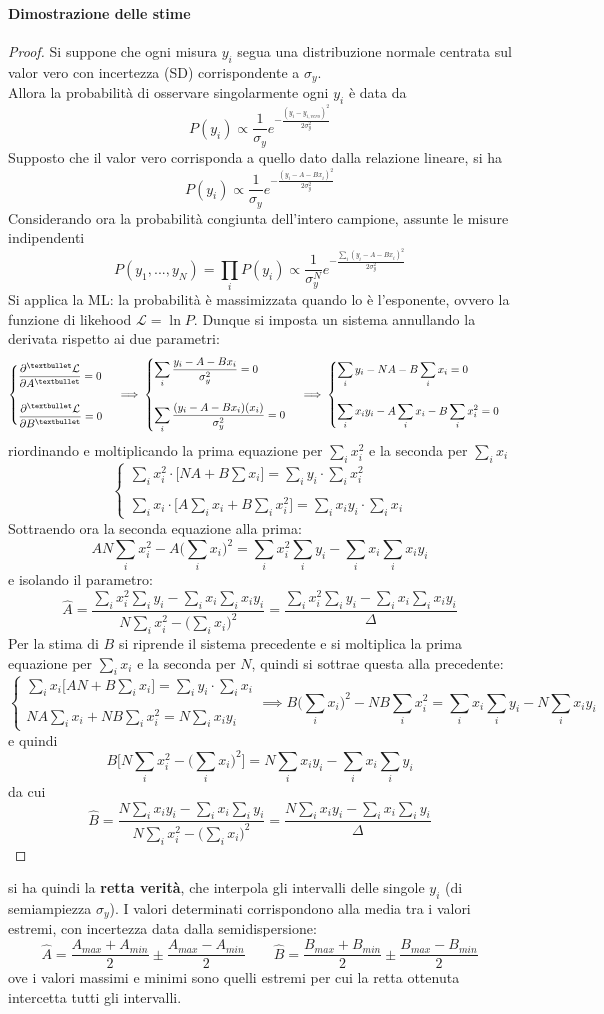 \documentclass[10pt, oneside]{book}
\newcommand{\casess}[2]{
\begin{cases} 
\displaystyle #1 \\ \\ 
\displaystyle #2
\end{cases}
}
\begin{document}
\paragraph{Dimostrazione delle stime}
\begin{proof}
Si suppone che ogni misura $y_i$ segua una distribuzione normale centrata sul valor vero con incertezza (SD) corrispondente a $\sigma_y$.\\
Allora la probabilità di osservare singolarmente ogni $y_i$ è data da
\[P(y_i) \propto \frac{1}{\sigma_y} e^{\displaystyle - \frac{(y_i - y_{i,vero})^2}{2 \sigma_y^2}}\]
Supposto che il valor vero corrisponda a quello dato dalla relazione lineare, si ha
\[P(y_i) \propto \frac{1}{\sigma_y} e^{\displaystyle - \frac{(y_i - A - B x_i)^2}{2 \sigma_y^2}}\]
Considerando ora la probabilità congiunta dell'intero campione, assunte le misure indipendenti
\[P(y_1, ..., y_N) = \prod_i P(y_i) \propto \frac{1}{\sigma_y^N} e^{\displaystyle - \frac{\sum_i (y_i - A - B x_i)^2}{2 \sigma_y^2}}\]
Si applica la ML: la probabilità è massimizzata quando lo è l'esponente, ovvero la funzione di likehood $\mathcal{L} = \ln P$. Dunque si imposta un sistema annullando la derivata rispetto ai due parametri:
\[\casess{\pdv[•]{\mathcal{L}}{A} = 0}{\pdv[•]{\mathcal{L}}{B} = 0} 
\implies \casess{\sum_i \frac{y_i - A - B x_i}{\sigma_y^2} = 0}{\sum_i \frac{(y_i - A - B x_i)(x_i)}{\sigma_y^2} = 0}
\implies 
\casess{\sum_i y_i - NA - B \sum_i x_i = 0}{\sum_i x_i y_i - A \sum_i x_i - B \sum_i x_i^2 = 0}
\]
riordinando e moltiplicando la prima equazione per $\sum_i x_i^2$ e la seconda per $\sum_i x_i$
\[
\casess{\sum_i x_i^2 \cdot \bigg[NA + B \sum x_i \bigg] = \sum_i y_i \cdot \sum_i x_i^2 }{\sum_i x_i \cdot \bigg[A \sum_i x_i + B \sum_i x_i^2\bigg] = \sum_i x_i y_i \cdot \sum_i x_i}
\]
Sottraendo ora la seconda equazione alla prima:
\[AN \sum_i x_i^2 - A \bigg(\sum_i x_i\bigg)^2 = \sum_i x_i^2 \sum_i y_i - \sum_i x_i \sum_i x_i y_i\]
e isolando il parametro:
\[\hat{A} = \frac{\sum_i x_i^2 \sum_i y_i - \sum_i x_i \sum_i x_i y_i}{N \sum_i x_i^2 - \big(\sum_i x_i\big)^2} = \frac{\sum_i x_i^2 \sum_i y_i - \sum_i x_i \sum_i x_i y_i}{\Delta}\]
Per la stima di $B$ si riprende il sistema precedente e si moltiplica la prima equazione per $\sum_i x_i$ e la seconda per $N$, quindi si sottrae questa alla precedente:
\[\casess{\sum_i x_i \bigg[AN + B \sum_i x_i\bigg] = \sum_i y_i \cdot \sum_i x_i}{NA \sum_i x_i + NB \sum_i x_i^2 = N \sum_i x_i y_i} \implies B \bigg(\sum_i x_i\bigg)^2 - NB \sum_i x_i^2 = \sum_i x_i \sum_i y_i - N \sum_i x_i y_i\]
e quindi
\[B \bigg[N \sum_i x_i^2 - \bigg(\sum_i x_i\bigg)^2\bigg] = N \sum_i x_i y_i - \sum_i x_i \sum_i y_i\]
da cui
\[\hat{B} = \frac{N \sum_i x_i y_i - \sum_i x_i \sum_i y_i}{N \sum_i x_i^2 - \big(\sum_i x_i\big)^2} = \frac{N \sum_i x_i y_i - \sum_i x_i \sum_i y_i}{\Delta}\]
\end{proof}
si ha quindi la \textbf{retta verità}, che interpola gli intervalli delle singole $y_i$ (di semiampiezza $\sigma_y$). I valori determinati corrispondono alla media tra i valori estremi, con incertezza data dalla semidispersione:
\[\hat{A} = \frac{A_{max} + A_{min}}{2} \pm \frac{A_{max} - A_{min}}{2} \qquad \hat{B} = \frac{B_{max} + B_{min}}{2} \pm \frac{B_{max} - B_{min}}{2}\]
ove i valori massimi e minimi sono quelli estremi per cui la retta ottenuta intercetta tutti gli intervalli.
\end{document}
